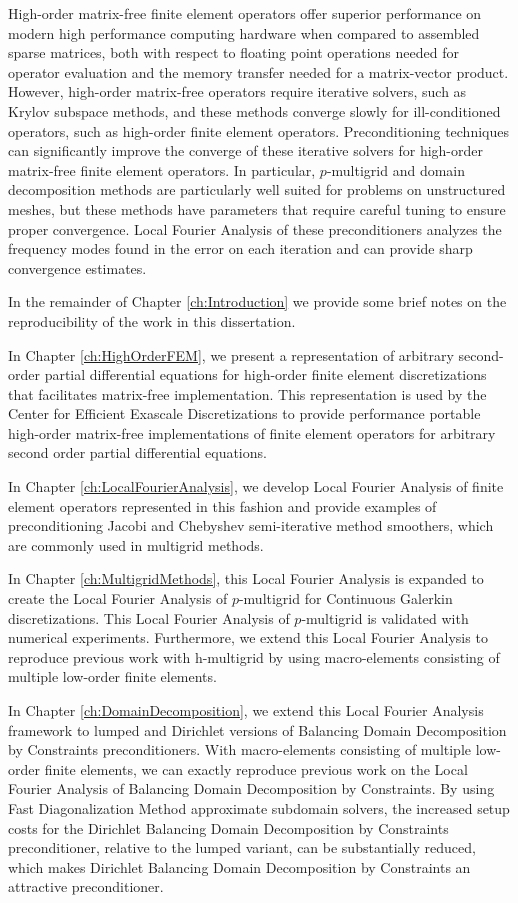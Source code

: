 High-order matrix-free finite element operators offer superior performance on modern high performance computing hardware when compared to assembled sparse matrices, both with respect to floating point operations needed for operator evaluation and the memory transfer needed for a matrix-vector product.
However, high-order matrix-free operators require iterative solvers, such as Krylov subspace methods, and these methods converge slowly for ill-conditioned operators, such as high-order finite element operators.
Preconditioning techniques can significantly improve the converge of these iterative solvers for high-order matrix-free finite element operators.
In particular, $p$-multigrid and domain decomposition methods are particularly well suited for problems on unstructured meshes, but these methods have parameters that require careful tuning to ensure proper convergence.
Local Fourier Analysis of these preconditioners analyzes the frequency modes found in the error on each iteration and can provide sharp convergence estimates.

In the remainder of Chapter \ref{ch:Introduction} we provide some brief notes on the reproducibility of the work in this dissertation.

In Chapter \ref{ch:HighOrderFEM}, we present a representation of arbitrary second-order partial differential equations for high-order finite element discretizations that facilitates matrix-free implementation.
This representation is used by the Center for Efficient Exascale Discretizations to provide performance portable high-order matrix-free implementations of finite element operators for arbitrary second order partial differential equations.

In Chapter \ref{ch:LocalFourierAnalysis}, we develop Local Fourier Analysis of finite element operators represented in this fashion and provide examples of preconditioning Jacobi and Chebyshev semi-iterative method smoothers, which are commonly used in multigrid methods.

In Chapter \ref{ch:MultigridMethods}, this Local Fourier Analysis is expanded to create the Local Fourier Analysis of $p$-multigrid for Continuous Galerkin discretizations.
This Local Fourier Analysis of $p$-multigrid is validated with numerical experiments.
Furthermore, we extend this Local Fourier Analysis to reproduce previous work with h-multigrid by using macro-elements consisting of multiple low-order finite elements.

In Chapter \ref{ch:DomainDecomposition}, we extend this Local Fourier Analysis framework to lumped and Dirichlet versions of Balancing Domain Decomposition by Constraints preconditioners.
With macro-elements consisting of multiple low-order finite elements, we can exactly reproduce previous work on the Local Fourier Analysis of Balancing Domain Decomposition by Constraints.
By using Fast Diagonalization Method approximate subdomain solvers, the increased setup costs for the Dirichlet Balancing Domain Decomposition by Constraints preconditioner, relative to the lumped variant, can be substantially reduced, which makes Dirichlet Balancing Domain Decomposition by Constraints an attractive preconditioner.

